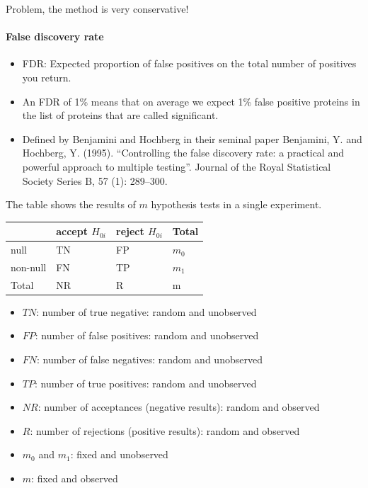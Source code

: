 \documentclass[
]{article}
\providecommand{\tightlist}{%
  \setlength{\itemsep}{0pt}\setlength{\parskip}{0pt}}
\begin{document}
Problem, the method is very conservative!

\hypertarget{false-discovery-rate}{%
\paragraph{False discovery rate}\label{false-discovery-rate}}

\begin{itemize}
\tightlist
\item
  FDR: Expected proportion of false positives on the total number of
  positives you return.
\item
  An FDR of 1\% means that on average we expect 1\% false positive
  proteins in the list of proteins that are called significant.
\item
  Defined by Benjamini and Hochberg in their seminal paper Benjamini, Y.
  and Hochberg, Y. (1995). ``Controlling the false discovery rate: a
  practical and powerful approach to multiple testing''. Journal of the
  Royal Statistical Society Series B, 57 (1): 289--300.
\end{itemize}

The table shows the results of \(m\) hypothesis tests in a single
experiment.

\begin{longtable}[]{@{}llll@{}}
\toprule
& accept \(H_{0i}\) & reject \(H_{0i}\) & Total \\
\midrule
\endhead
null & TN & FP & \(m_0\) \\
non-null & FN & TP & \(m_1\) \\
Total & NR & R & m \\
\bottomrule
\end{longtable}

\begin{itemize}
\tightlist
\item
  \(TN\): number of true negative: random and unobserved
\item
  \(FP\): number of false positives: random and unobserved
\item
  \(FN\): number of false negatives: random and unobserved
\item
  \(TP\): number of true positives: random and unobserved
\item
  \(NR\): number of acceptances (negative results): random and observed
\item
  \(R\): number of rejections (positive results): random and observed
\item
  \(m_0\) and \(m_1\): fixed and unobserved
\item
  \(m\): fixed and observed
\end{itemize}
\end{document}
